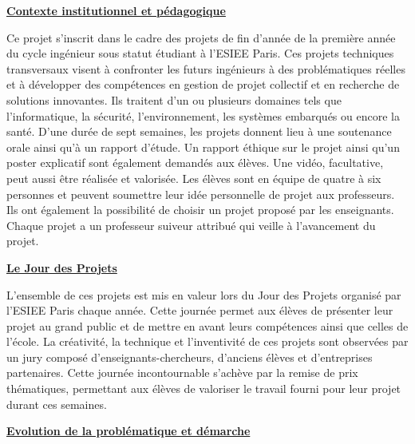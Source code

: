 \uline{\textbf{Contexte institutionnel et pédagogique}}

Ce projet s'inscrit dans le cadre des projets de fin d'année de la première année du cycle ingénieur sous statut étudiant à l'ESIEE Paris. Ces projets techniques transversaux visent à confronter les futurs ingénieurs à des problématiques réelles et à développer des compétences en gestion de projet collectif et en recherche de solutions innovantes. Ils traitent d'un ou plusieurs domaines tels que l'informatique, la sécurité, l'environnement, les systèmes embarqués ou encore la santé. D'une durée de sept semaines, les projets donnent lieu à une soutenance orale ainsi qu'à un rapport d'étude. Un rapport éthique sur le projet ainsi qu'un poster explicatif sont également demandés aux élèves. Une vidéo, facultative, peut aussi être réalisée et valorisée. Les élèves sont en équipe de quatre à six personnes et peuvent soumettre leur idée personnelle de projet aux professeurs. Ils ont également la possibilité de choisir un projet proposé par les enseignants. Chaque projet a un professeur suiveur attribué qui veille à l'avancement du projet. 

\bigskip

\uline{\textbf{Le Jour des Projets}}

L'ensemble de ces projets est mis en valeur lors du Jour des Projets organisé par l'ESIEE Paris chaque année. Cette journée permet aux élèves de présenter leur projet au grand public et de mettre en avant leurs compétences ainsi que celles de l'école. La créativité, la technique et l'inventivité de ces projets sont observées par un jury composé d'enseignants-chercheurs, d'anciens élèves et d'entreprises partenaires. Cette journée incontournable s'achève par la remise de prix thématiques, permettant aux élèves de valoriser le travail fourni pour leur projet durant ces semaines.

\bigskip

\uline{\textbf{Evolution de la problématique et démarche}}

